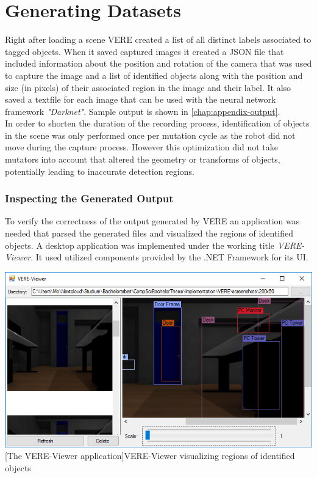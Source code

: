 \section{Generating Datasets}
Right after loading a scene \ac{VERE} created a list of all distinct labels associated to tagged objects. When it saved captured images it created a JSON file that included information about the position and rotation of the camera that was used to capture the image and a list of identified objects along with the position and size (in pixels) of their associated region in the image and their label. It also saved a textfile for each image that can be used with the neural network framework \emph{"Darknet"}. Sample output is shown in \ref{chap:appendix-output}.\\
In order to shorten the duration of the recording process, identification of objects in the scene was only performed once per mutation cycle as the robot did not move during the capture process. However this optimization did not take mutators into account that altered the geometry or transforms of objects, potentially leading to inaccurate detection regions.

\subsubsection{Inspecting the Generated Output}
To verify the correctness of the output generated by \ac{VERE} an application was needed that parsed the generated files and visualized the regions of identified objects. A desktop application was implemented under the working title \emph{VERE-Viewer}. It used utilized components provided by the .NET Framework for its UI.

\begin{center}
\noindent\includegraphics[width=14cm]{img/ch05/VERE_Viewer_Application02.png}
[The VERE-Viewer application]{VERE-Viewer visualizing regions of identified objects}
\label{fig:vere-viewer}
\end{center}

